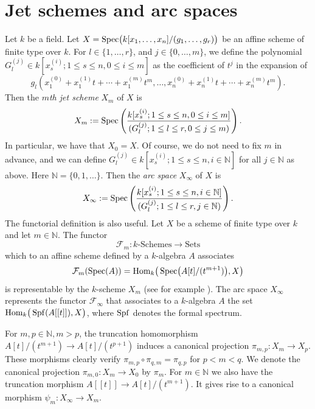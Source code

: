 \section{Jet schemes and arc spaces}\label{sec:section_2}

Let $k$ be a field. Let $X=\operatorname{Spec} \bigl(k[x_1, \ldots ,x_n] / (g_1, \ldots ,g_r)\bigr)$ be an affine scheme of finite type over $k$. For $l\in \{1, \ldots ,r\}$, and $j\in \{0, \ldots ,m\}$, we define the polynomial $G_l^{(j)} \in k[x_s^{(i)}; 1\leq s\leq n, 0\leq i\leq m]$ as the coefficient of $t^j$ in the expansion of
\begin{equation}
  g_l( x_1^{(0)}+x_1^{(1)}t+  \cdots  + x_1^{(m)} t^m, \ldots, x_n^{(0)}+x_n^{(1)} t+  \cdots  + x_n^{(m)}t^m ) . 
 \end{equation}
Then the \textit{$m$th jet scheme} $X_m$ of $X$ is
\[ X_m := \operatorname{Spec}\left(\frac{k[x_s^{(i)}; 1\leq s\leq n, 0\leq i\leq m]}{(G_l^{(j)}; 1\leq l \leq r , 0\leq j \leq m) } \right). \]
In particular, we have that $X_0=X$. Of course, we do not need to fix $m$ in advance, and we can define $G_l^{(j)} \in k[x_s^{(i)}; 1\leq s\leq n, i\in \mathbb{N}]$ for all $j\in \mathbb{N}$ as above. Here $\mathbb{N} = \{0,1,\ldots\}$. Then the \textit{arc space} $X_{\infty}$ of $X$ is
\[ X_{\infty} := \operatorname{Spec}\left(\frac{k[x_s^{(i)}; 1\leq s\leq n, i\in \mathbb{N}]}{(G_l^{(j)}; 1\leq l \leq r , j\in \mathbb{N}) } \right). \]
The functorial definition is also useful. Let $X$ be a scheme of finite type over $k$ and let $m \in \mathbb{N}$. The functor 
\[ \mathcal{F}_m : k\text{-Schemes} \rightarrow \text{Sets} \]
which to an affine scheme defined by a $k$-algebra $A$ associates 
\[ \mathcal{F}_m(\operatorname{Spec}(A))= \operatorname{Hom}_k\bigr(\operatorname{Spec}\bigl(A[t]/(t^{m+1}) \bigr) ,X\bigr) \]
is representable by the $k$-scheme $X_m$ (see for example \cite{ishii_intro,vojta}). The arc space $X_{\infty}$ represents the functor $\mathcal{F}_{\infty}$ that associates to a $k$-algebra $A$ the set $\operatorname{Hom}_k\bigr( \operatorname{Spf}(A[[t]]) ,X\bigr)$, where $\operatorname{Spf}$ denotes the formal spectrum. 

For $m,p \in \mathbb{N}, m > p$, the truncation homomorphism $A[t]/(t^{m+1}) \rightarrow A[t]/(t^{p+1})$ induces
a canonical projection $\pi_{m,p}: X_m \rightarrow X_p.$ These morphisms clearly verify $\pi_{m,p}\circ \pi_{q,m}=\pi_{q,p}$
for $p<m<q$. We denote the canonical projection $\pi_{m,0}:X_m\rightarrow X_0$ by $\pi_{m}$. For $m\in \mathbb{N}$ we also have the truncation morphism $A[[t]] \rightarrow A[t]/(t^{m+1})$. It gives rise to a canonical morphism $\psi_{m}: X_{\infty} \longrightarrow X_m$.

